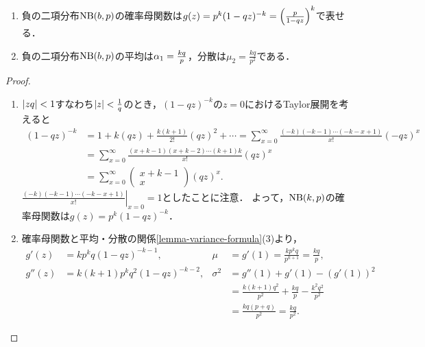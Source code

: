 \documentclass[uplatex,dvipdfmx]{jsreport}
\begin{document}
\begin{proposition}[負の二項分布の確率母関数・平均・分散]\mbox{}
    \begin{enumerate}
        \item 負の二項分布$\mathrm{NB}(b,p)$の確率母関数は$g(z)=p^k(1-qz)^{-k}=\left(\frac{p}{1-qz}\right)^k$で表せる．
        \item 負の二項分布$\mathrm{NB}(b,p)$の平均は$\alpha_1=\frac{kq}{p}$，分散は$\mu_2=\frac{kq}{p^2}$である．
    \end{enumerate}
\end{proposition}
\begin{proof}\mbox{}
    \begin{enumerate}
        \item $\lvert zq\rvert<1$すなわち$\lvert z\rvert<\frac{1}{q}$のとき，$(1-qz)^{-k}$の$z=0$におけるTaylor展開を考えると
        \begin{align*}
            (1-qz)^{-k}&=1+k(qz)+\frac{k(k+1)}{2!}(qz)^2+\cdots=\sum^\infty_{x=0}\frac{(-k)(-k-1)\cdots(-k-x+1)}{x!}(-qz)^x\\
            &=\sum^\infty_{x=0}\frac{(x+k-1)(x+k-2)\cdots(k+1)k}{x!}(qz)^x\\
            &=\sum^\infty_{x=0}\begin{pmatrix}x+k-1\\x\end{pmatrix}(qz)^x.
        \end{align*}
        $\left.\frac{(-k)(-k-1)\cdots(-k-x+1)}{x!}\right|_{x=0}=1$としたことに注意．
        よって，$\mathrm{NB}(k,p)$の確率母関数は$g(z)=p^k(1-qz)^{-k}$．
        \item 確率母関数と平均・分散の関係\ref{lemma-variance-formula}(3)より，
        \begin{align*}
            g'(z)&=kp^kq(1-qz)^{-k-1},&\mu&=g'(1)=\frac{kp^kq}{p^{k+1}}=\frac{kq}{p},\\
            g''(z)&=k(k+1)p^kq^2(1-qz)^{-k-2},&\sigma^2&=g''(1)+g'(1)-(g'(1))^2\\
            &&&=\frac{k(k+1)q^2}{p^2}+\frac{kq}{p}-\frac{k^2q^2}{p^2}\\
            &&&=\frac{kq(p+q)}{p^2}=\frac{kq}{p^2}.
        \end{align*}
    \end{enumerate}
\end{proof}
\end{document}
